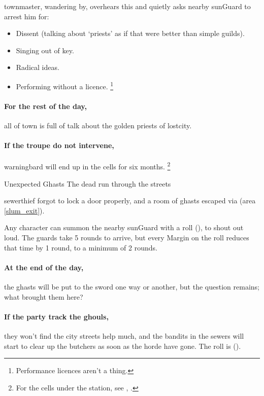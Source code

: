 \Gls{townmaster}, wandering by, overhears this and quietly asks nearby \gls{sunGuard} to arrest him for:

\begin{itemize}
  \item
  Dissent (talking about `priests' as if that were better than simple guilds).
  \item
  Singing out of key.
  \item
  Radical ideas.
  \item
  Performing without a licence.%
  \footnote{Performance licences aren't a thing.}
\end{itemize}

\paragraph{For the rest of the day,}
all of \gls{town} is full of talk about the golden priests of \gls{lostcity}.

\paragraph{If the troupe do not intervene,}
\gls{warningbard} will end up in the cells for six months.
\footnote{For the cells under the  station, see , .}

\warningbard

{Unexpected Ghasts}%
{The dead run through the streets}%

\Gls{sewerthief} forgot to lock a door properly, and a room of ghasts escaped via  (area \vref{slum_exit}).




Any character can summon the nearby \gls{sunGuard} with a  roll (\tn[7]), to shout out loud.
The guards take 5 rounds to arrive, but every Margin on the roll reduces that time by 1 round, to a minimum of 2 rounds.

\paragraph{At the end of the day,}
the ghasts will be put to the sword one way or another, but the question remains; what brought them here?

\paragraph{If the party track the ghouls,}
they won't find the city streets help much, and the bandits in the sewers will start to clear up the butchers as soon as the horde have gone.
The roll is  (\tn[14]).

